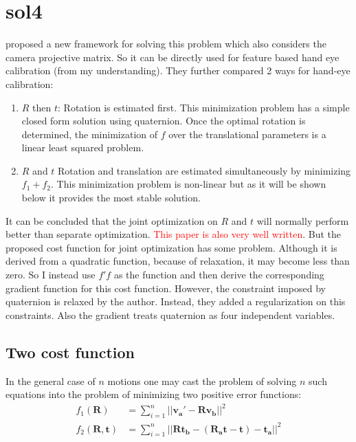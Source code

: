 \section{sol4}
\cite{horaud1995hand} proposed a new framework for solving this problem which also considers the camera projective matrix. So it can be directly used for feature based hand eye calibration (from my understanding). They further compared 2 ways for hand-eye calibration:
\begin{enumerate}
	\item $R$ then $t$: Rotation is estimated first. This minimization problem has a simple closed 
form solution using quaternion. Once the optimal rotation is determined,  
the minimization of $f$ over the translational parameters is a linear least squared problem.
	\item $R$ and $t$ Rotation and translation are estimated simultaneously by minimizing $f_1+f_2$. This
minimization problem is non-linear but as it will be shown below it provides the most stable
solution.
\end{enumerate}
It can be concluded that the joint optimization on $R$ and $t$ will normally perform better than separate optimization. \textcolor{red}{This paper is also very well written}. But the proposed cost function for joint optimization has some problem. Although it is derived from a quadratic function, because of relaxation, it may become less than zero. So I instead use $f'f$ as the function and then derive the corresponding gradient function for this cost function. However, the constraint imposed by quaternion is relaxed by the author. Instead, they added a  regularization on this constraints. Also the gradient treats quaternion as four independent variables.\\
\subsection{Two cost function}
In the general case of $n$ motions one may cast the problem of solving 
$n$ such equations into the problem of minimizing two positive error functions:
\begin{align}
f_1(\mathbf{R})&=\sum_{i=1}^{n} ||\mathbf{v_a'-Rv_b}||^2 \\
f_2(\mathbf{R,t})&=\sum_{i=1}^{n} ||\mathbf{Rt_b-(R_at-t)-t_a}||^2 
\end{align}
